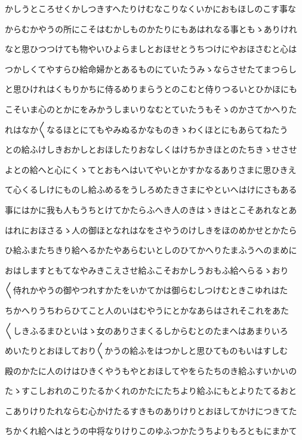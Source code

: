 \documentclass[a4paper,11pt,landscape]{ltjtarticle}
\begin{document}
かしうところせくかしつきすへたりけむなこりなくいかにおもほしのこす事な
\par\medskip
からむかやうの所にこそはむかしものかたりにもあはれなる事ともゝありけれ
\par\medskip
なと思ひつつけても物やいひよらましとおほせとうちつけにやおほさむと心は
\par\medskip
つかしくてやすらひ給命婦かとあるものにていたうみゝならさせたてまつらし
\par\medskip
と思ひけれはくもりかちに侍るめりまらうとのこむと侍りつるいとひかほにも
\par\medskip
こそいま心のとかにをみかうしまいりなむとていたうもそゝのかさてかへりた
\par\medskip
れはなか〱なるほとにてもやみぬるかなものきゝわくほとにもあらてねたう
\par\medskip
との給ふけしきおかしとおほしたりおなしくはけちかきほとのたちきゝせさせ
\par\medskip
よとの給へと心にくゝてとおもへはいてやいとかすかなるありさまに思ひきえ
\par\medskip
て心くるしけにものし給ふめるをうしろめたきさまにやといへはけにさもある
\par\medskip
事にはかに我も人もうちとけてかたらふへき人のきはゝきはとこそあれなとあ
\par\medskip
はれにおほさるゝ人の御ほとなれはなをさやうのけしきをほのめかせとかたら
\par\medskip
ひ給ふまたちきり給へるかたやあらむいとしのひてかへりたまふうへのまめに
\par\medskip
おはしますともてなやみきこえさせ給ふこそおかしうおもふ給へらるゝおり
\par\medskip
〱侍れかやうの御やつれすかたをいかてかは御らむしつけむときこゆれはた
\par\medskip
ちかへりうちわらひてこと人のいはむやうにとかなあらはされそこれをあた
\par\medskip
〱しきふるまひといはゝ女のありさまくるしからむとのたまへはあまりいろ
\par\medskip
めいたりとおほしており〱かうの給ふをはつかしと思ひてものもいはすしむ
\par\medskip
殿のかたに人のけはひきくやうもやとおほしてやをらたちのき給ふすいかいの
\par\medskip
たゝすこしおれのこりたるかくれのかたにたちより給ふにもとよりたてるおと
\par\medskip
こありけりたれならむ心かけたるすきものありけりとおほしてかけにつきてた
\par\medskip
ちかくれ給へはとうの中将なりけりこのゆふつかたうちよりもろともにまかて
\end{document}
